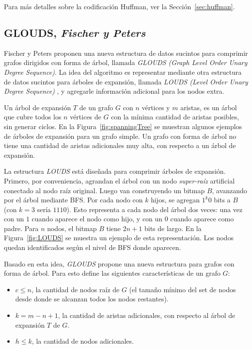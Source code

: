 Para más detalles sobre la codificación Huffman, ver la Sección~\ref{sec:huffman}.


\subsection{GLOUDS, \textit{Fischer y Peters}}
Fischer y Peters \cite{fischer2016glouds} proponen una nueva estructura de datos sucintos para comprimir grafos dirigidos con forma de árbol, llamada \textit{GLOUDS (Graph Level Order Unary Degree Sequence)}. La idea del algoritmo es representar mediante otra estructura de datos sucintos para árboles de expansión, llamada \textit{LOUDS (Level Order Unary Degree Sequence)} \cite{jacobson1989space}, y agregarle información adicional para los nodos extra.





Un árbol de expansión $T$ de un grafo $G$  con $n$ vértices y $m$ aristas, es un árbol que cubre todos los $n$ vértices de $G$ con la mínima cantidad de aristas posibles, sin generar ciclos. En la Figura~\ref{fig:spanningTree} se muestran algunos ejemplos de árboles de expansión para un grafo simple. Un grafo con forma de árbol no tiene una cantidad de aristas adicionales muy alta, con respecto a un árbol de expansión.

La estructura \textit{LOUDS} \cite{jacobson1989space} está diseñada para comprimir árboles de expansión. Primero, por conveniencia, agrandan el árbol con un nodo \textit{super-raíz} artificial conectado al nodo raíz original. Luego van construyendo un bitmap $B$, avanzando por el árbol mediante BFS. Por cada nodo con $k$ hijos, se agregan $1^{k}0$ bits a $B$ (con $k=3$ sería $1110$). Esto representa a cada nodo del árbol dos veces: una vez con un $1$ cuando aparece el nodo como hijo, y con un $0$ cuando aparece como padre. Para $n$ nodos, el bitmap $B$ tiene $2n + 1$ bits de largo. En la Figura~\ref{fig:LOUDS} se muestra un ejemplo de esta representación. Los nodos quedan identificados según el nivel de BFS donde aparecen.

Basado en esta idea, \textit{GLOUDS} \cite{fischer2016glouds} propone una nueva estructura para grafos con forma de árbol. Para esto define las siguientes características de un grafo $G$:

\begin{itemize}
	\item $c \leq n$, la cantidad de nodos raíz de $G$ (el tamaño mínimo del set de nodos desde donde se alcanzan todos los nodos restantes). 
	\item $k = m - n + 1$, la cantidad de aristas adicionales, con respecto al árbol de expansión $T$ de $G$.
	\item $h \leq k$, la cantidad de nodos adicionales.
\end{itemize}

